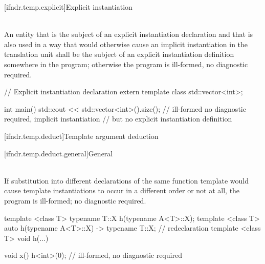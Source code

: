 [ifndr.temp.explicit]{Explicit instantiation}

\pnum
{} \\
An entity that is the subject of
an explicit instantiation declaration and that is also used in a way that would otherwise cause an implicit
instantiation in the translation unit shall be the subject of an explicit instantiation definition
somewhere in the program; otherwise the program is ill-formed, no diagnostic required.

\pnum
\begin{example}
\begin{codeblock}
// Explicit instantiation declaration
extern template class std::vector<int>;

int main() {
  std::cout << std::vector<int>().size();   // ill-formed no diagnostic required, implicit instantiation
                                            // but no explicit instantiation definition
}
\end{codeblock}
\end{example}


[ifndr.temp.deduct]{Template argument deduction}

[ifndr.temp.deduct.general]{General}

\pnum
{} \\
If substitution
into different declarations of the same function template would cause template instantiations to occur in a
different order or not at all, the program is ill-formed; no diagnostic required.

\pnum
\begin{example}
\begin{codeblock}
template <class T> typename T::X h(typename A<T>::X);
template <class T> auto h(typename A<T>::X) -> typename T::X;   // redeclaration
template <class T> void h(...) { }

void x() {
  h<int>(0);    // ill-formed, no diagnostic required
}
\end{codeblock}
\end{example}
